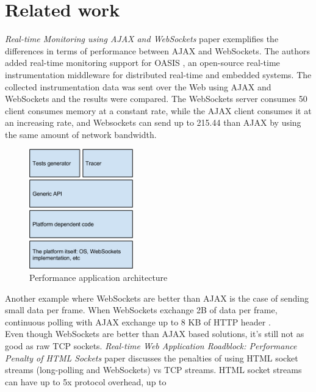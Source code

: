 \documentclass[conference]{IEEEtran}
\begin{document}
\section{Related work}
\textit{Real-time Monitoring using AJAX and WebSockets} paper \cite{RT-Monitoring}
exemplifies the differences in terms of performance between AJAX and WebSockets.
The authors added real-time monitoring support for OASIS \cite{OASIS},
an open-source real-time instrumentation middleware for distributed real-time
and embedded systems. The collected instrumentation data was sent over the Web
using AJAX and WebSockets and the results were compared. The WebSockets server
consumes 50%
client consumes memory at a constant rate, while the AJAX client consumes it
at an increasing rate, and Websockets can send up to 215.44%
than AJAX by using the same amount of network bandwidth.
\\
\begin{frame}{}
  \begin{figure}
    \centering
    \includegraphics[width=0.4\textwidth]{Architecture.png}
    \caption{Performance application architecture}
  \end{figure}
\end{frame}
\indent
Another example where WebSockets are better than AJAX is the case of sending
small data per frame. When WebSockets exchange 2B of data per frame, continuous
polling with AJAX exchange up to 8 KB of HTTP header \cite{2009:Misc}.
\\
\indent
Even though WebSockets are better than AJAX based solutions, it's still not as
good as raw TCP sockets. \textit{Real-time Web Application Roadblock:
Performance Penalty of HTML Sockets} paper \cite{Performance-Penalty} discusses
the penalties of using HTML socket streams (long-polling and WebSockets) vs
TCP streams. HTML socket streams can have up to 5x protocol overhead, up to
\end{document}
